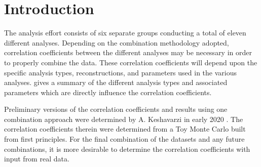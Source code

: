 
\graphicspath{{Body/Figures/}}

\section{Introduction}

The \Rone \wa analysis effort consists of six separate groups conducting a total of eleven different analyses. Depending on the combination methodology adopted, correlation coefficients between the different analyses may be necessary in order to properly combine the data. These correlation coefficients will depend upon the specific analysis types, reconstructions, and parameters used in the various analyses.  gives a summary of the different analysis types and associated parameters which are directly influence the correlation coefficients. 

Preliminary versions of the correlation coefficients and results using one combination approach were determined by A. Keshavarzi in early 2020 \cite{AlexCombinationNote}. The correlation coefficients therein were determined from a Toy Monte Carlo built from first principles. For the final combination of the \Rone datasets and any future combinations, it is more desirable to determine the correlation coefficients with input from real data. 





